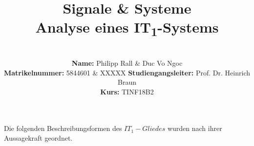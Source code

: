 \documentclass{article}
\title{\textbf{Signale \& Systeme \\ Analyse eines IT\textsubscript{1}-Systems}}
\author{
\vspace{8em} \\
\textbf{Name:} Philipp Rall \& Duc Vo Ngoc \\
\textbf{Matrikelnummer:} 5844601 \& XXXXX
\textbf{Studiengangsleiter:} Prof. Dr. Heinrich Braun\\
\textbf{Kurs:} TINF18B2 \\
\vspace{8em} 
}
\begin{document}
\maketitle
\newpage
\noindent
Die folgenden Beschreibungsformen des $IT_1-Gliedes$ wurden nach ihrer Aussagekraft geordnet.










\end{document}
